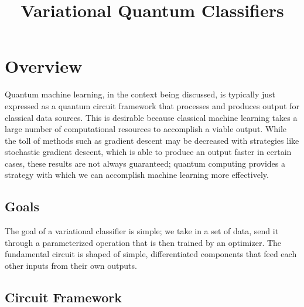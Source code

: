 \documentclass[12pt]{article}
\title{Variational Quantum Classifiers}
\begin{document}
\maketitle

\tableofcontents

\section{Overview}
    Quantum machine learning, in the context being discussed, is typically just expressed as 
    a quantum circuit framework that processes and produces output for classical data sources. This is 
    desirable because classical machine learning takes a large number of computational resources to accomplish 
    a viable output. While the toll of methods such as gradient descent may be decreased with strategies like stochastic
    gradient descent, which is able to produce an output faster in certain cases, these results are not always guaranteed;
    quantum computing provides a strategy with which we can accomplish machine learning more effectively.

    \subsection{Goals}
        The goal of a variational classifier is simple; we take in a set of data, send it through a parameterized operation 
        that is then trained by an optimizer. The fundamental circuit is shaped of 
        simple, differentiated components that feed each other inputs from their own outputs.

    \subsection{Circuit Framework}
        \begin{center}
        \end{center}
    
\end{document}
